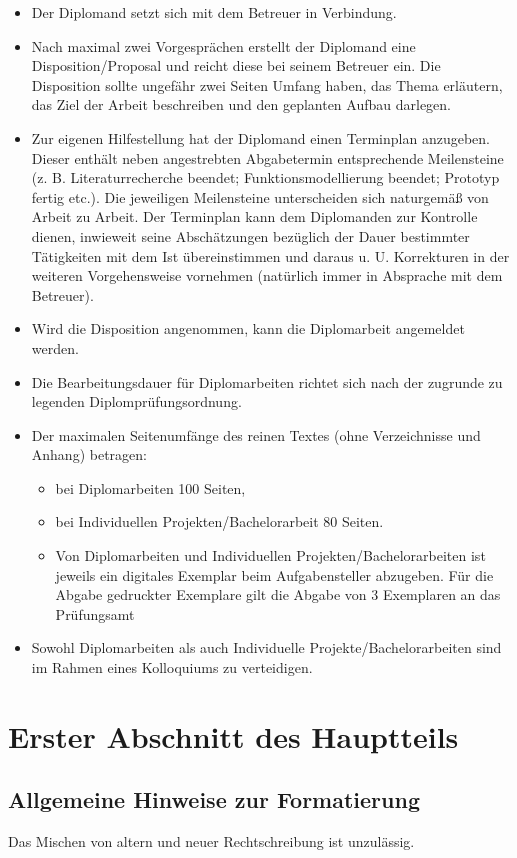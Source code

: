 \documentclass[11pt]{scrartcl}
\begin{document}
\begin{itemize}
  \item Der Diplomand setzt sich mit dem Betreuer in Verbindung.
  \item Nach maximal zwei Vorgesprächen erstellt der Diplomand eine Disposition/Proposal  und reicht diese bei seinem Betreuer ein. Die Disposition sollte ungefähr zwei Seiten Umfang haben, das Thema erläutern, das Ziel der Arbeit beschreiben und den geplanten Aufbau darlegen.
  \item Zur eigenen Hilfestellung hat der Diplomand einen Terminplan anzugeben. Dieser enthält neben angestrebten Abgabetermin entsprechende Meilensteine (z. B. Literaturrecherche beendet; Funktionsmodellierung beendet; Prototyp fertig etc.). Die jeweiligen Meilensteine unterscheiden sich naturgemäß von Arbeit zu Arbeit. Der Terminplan kann dem Diplomanden zur Kontrolle dienen, inwieweit seine Abschätzungen bezüglich der Dauer bestimmter Tätigkeiten mit dem Ist übereinstimmen und daraus u. U. Korrekturen in der weiteren Vorgehensweise vornehmen (natürlich immer in Absprache mit dem Betreuer).
  \item Wird die Disposition angenommen, kann die Diplomarbeit angemeldet werden.
  \item Die Bearbeitungsdauer für Diplomarbeiten  richtet sich nach der zugrunde zu legenden Diplomprüfungsordnung.
  \item Der maximalen Seitenumfänge des reinen Textes (ohne Verzeichnisse und Anhang) betragen:
  \begin{itemize}
    \item bei Diplomarbeiten 100 Seiten,
    \item bei Individuellen Projekten/Bachelorarbeit 80 Seiten.
    \item Von Diplomarbeiten und Individuellen Projekten/Bachelorarbeiten ist jeweils ein digitales Exemplar beim Aufgabensteller abzugeben. Für die Abgabe gedruckter Exemplare gilt die Abgabe von 3 Exemplaren an das Prüfungsamt
  \end{itemize}
  \item Sowohl Diplomarbeiten als auch Individuelle Projekte/Bachelorarbeiten sind im Rahmen eines Kolloquiums zu verteidigen.
\end{itemize}
  
  
\section{Erster Abschnitt des Hauptteils}
\subsection{Allgemeine Hinweise zur Formatierung}
Das Mischen von altern und neuer Rechtschreibung ist unzulässig. 
\end{document}
